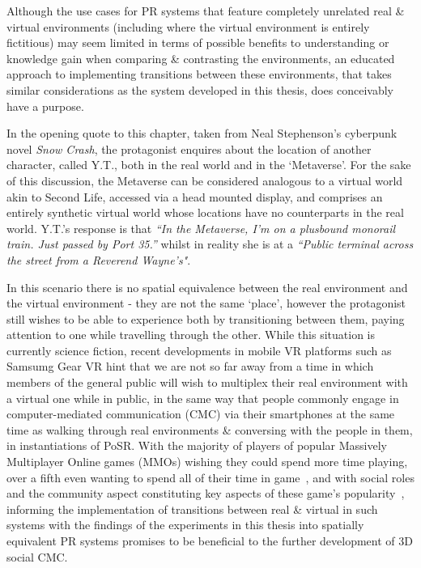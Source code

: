 Although the use cases for PR systems that feature completely unrelated real \& virtual environments (including where the virtual environment is entirely fictitious) may seem limited in terms of possible benefits to understanding or knowledge gain when comparing \& contrasting the environments, an educated approach to implementing transitions between these environments, that takes similar considerations as the system developed in this thesis, does conceivably have a purpose.

In the opening quote to this chapter, taken from Neal Stephenson's cyberpunk novel \textit{Snow Crash}, the protagonist enquires about the location of another character, called Y.T., both in the real world and in the `Metaverse'. For the sake of this discussion, the Metaverse can be considered analogous to a virtual world akin to Second Life, accessed via a head mounted display, and comprises an entirely synthetic virtual world whose locations have no counterparts in the real world. Y.T.'s response is that \textit{``In  the Metaverse, I'm on a plusbound monorail train. Just passed by Port 35.''} whilst in reality she is at a \textit{``Public terminal across the street from a Reverend Wayne's"}.

In this scenario there is no spatial equivalence between the real environment and the virtual environment - they are not the same `place', however the protagonist still wishes to be able to experience both by transitioning between them, paying attention to one while travelling through the other. While this situation is currently science fiction, recent developments in mobile VR platforms such as Samsumg Gear VR hint that we are not so far away from a time in which members of the general public will wish to multiplex their real environment with a virtual one while in public, in the same way that people commonly engage in computer-mediated communication (CMC) via their smartphones at the same time as walking through real environments \& conversing with the people in them, in instantiations of PoSR. With the majority of players of popular Massively Multiplayer Online games (MMOs) wishing they could spend more time playing, over a fifth even wanting to spend all of their time in game~\cite{Castronova2006}, and with social roles and the community aspect constituting key aspects of these game's popularity~\cite{Castronova2006, Bartle2004}, informing the implementation of transitions between real \& virtual in such systems with the findings of the experiments in this thesis into spatially equivalent PR systems promises to be beneficial to the further development of 3D social CMC.

